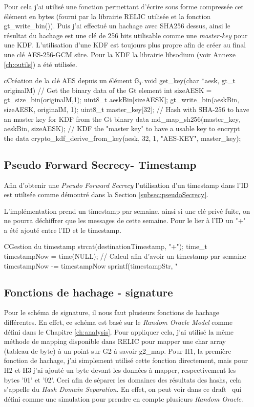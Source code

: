 Pour cela j'ai utilisé une fonction permettant d'écrire sous forme compressée cet élément en bytes (fourni par la librairie RELIC utilisée et la fonction gt\_write\_bin()). Puis j'ai effectué un hachage avec SHA256 dessus, ainsi le résultat du hachage est une clé de 256 bits utilisable comme une \textit{master-key} pour une KDF. L'utilisation d'une KDF est toujours plus propre afin de créer au final une clé AES-256-GCM sûre. Pour la KDF la librairie libsodium (voir Annexe \ref{ch:outils}) a été utilisée.

\begin{sourcebox}{c}{Création de la clé AES depuis un élément $\mathbb{G}_T$}
	void get_key(char *aesk, gt_t originalM) {
		// Get the binary data of the Gt element
		int sizeAESK = gt_size_bin(originalM,1);
		uint8_t aeskBin[sizeAESK];
		gt_write_bin(aeskBin, sizeAESK, originalM, 1);
		uint8_t master_key[32];
		// Hash with SHA-256 to have an master key for KDF from the Gt binary data
		md_map_sh256(master_key, aeskBin, sizeAESK);
		// KDF the "master key" to have a usable key to encrypt the data
		crypto_kdf_derive_from_key(aesk, 32, 1, "AES-KEY", master_key);
	}
\end{sourcebox}

\subsection{Pseudo Forward Secrecy- Timestamp}
Afin d'obtenir une \textit{Pseudo Forward Secrecy} l'utilisation d'un timestamp dans l'ID est utilisée comme démontré dans la Section \ref{subsec:pseudoSecrecy}.

L'implémentation prend un timestamp par semaine, ainsi si une clé privé fuite, on ne pourra déchiffrer que les messages de cette semaine. Pour le lier à l'ID un "+" a été ajouté entre l'ID et le timestamp.
\begin{sourcebox}{C}{Gestion du timestamp}
	strcat(destinationTimestamp, "+");
	time_t timestampNow = time(NULL);
	// Calcul afin d'avoir un timestamp par semaine
	timestampNow -= timestampNow %
	sprintf(timestampStr, "%
\end{sourcebox}

\subsection{Fonctions de hachage - signature}
Pour le schéma de signature, il nous faut plusieurs fonctions de hachage différentes. En effet, ce schéma est basé sur le \textit{Random Oracle Model} comme défini dans le Chapitre \ref{ch:analysis}. Pour appliquer cela, j'ai utilisé la même méthode de mapping disponible dans RELIC pour mapper une char array (tableau de byte) à un point sur G2 à savoir g2\_map.
Pour H1, la première fonction de hachage, j'ai simplement utilisé cette fonction directement, mais pour H2 et H3 j'ai ajouté un byte devant les données à mapper, respectivement les bytes '01' et '02'. Ceci afin de séparer les domaines des résultats des hashs, cela s'appelle du \textit{Hash Domain Separation}. En effet, on peut voir dans ce draft~\cite{irtf-cfrg-hash-to-curve} qui défini comme une simulation pour prendre en compte plusieurs \textit{Random Oracle}.


